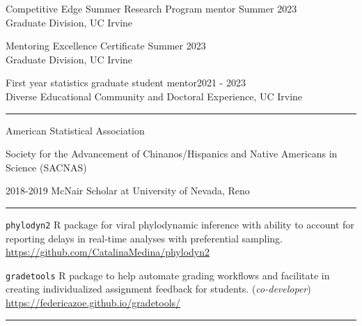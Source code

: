 \documentclass{article}
\begin{document}
	
	
	
	\begin{description}
		\vspace{-2mm}
		\item[Mentoring]\hspace*{.01in}
		
		Competitive Edge Summer Research Program mentor \hfill{Summer 2023}\\
		Graduate Division, UC Irvine 
		\vspace*{1mm}
		
		Mentoring Excellence Certificate \hfill{Summer 2023}\\
		Graduate Division, UC Irvine
		\vspace*{1mm}
		
		First year statistics graduate student mentor\hfill{2021 - 2023}\\
		Diverse Educational Community and Doctoral Experience, UC Irvine
		
	\end{description}
	\vspace{-2mm}
	\rule{\linewidth}{1pt}
	
	
	
	\begin{description}
		\vspace{-2mm}
		\item[Programs and Professional Membership]\hspace*{.01in}
		
		American Statistical Association
		
		Society for the Advancement of Chinanos/Hispanics and Native Americans in Science (SACNAS)
		
		2018-2019 McNair Scholar at University of Nevada, Reno
		
	\end{description}
	\vspace{-2mm}
	\rule{\linewidth}{1pt}
	
	
	\begin{description}
		\vspace{-2mm}
		\item[Software Developed]\hspace*{.1in}
		
		\texttt{phylodyn2} R package for viral phylodynamic inference with ability to account for reporting delays in real-time analyses with preferential sampling. \url{https://github.com/CatalinaMedina/phylodyn2}
		
		\texttt{gradetools} R package to help automate grading workflows and facilitate in creating individualized assignment feedback for students. (\textit{co-developer}) \url{https://federicazoe.github.io/gradetools/}
		
	\end{description}
	\vspace{-2mm}
	\rule{\linewidth}{1pt}
	
\end{document}
